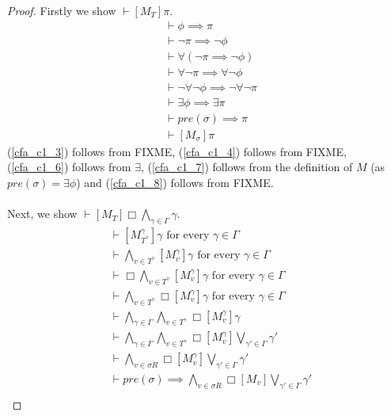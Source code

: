 \documentclass[12pt, a4paper, titlepage]{scrartcl}
\numberwithin{equation}{section}
\newcommand{\sqex}[1]{[{#1}]}
\begin{document}
\begin{proof}
Firstly we show $\vdash \sqex{M_T} \pi$.
\begin{align}
	& \vdash \phi \implies \pi \label{cfa_c1_1} \\
	& \vdash \neg \pi \implies \neg \phi \label{cfa_c1_2}\\
	& \vdash \forall (\neg \pi \implies \neg \phi) \label{cfa_c1_3}\\
	& \vdash \forall \neg \pi \implies \forall \neg \phi \label{cfa_c1_4}\\
	& \vdash \neg \forall \neg \phi \implies \neg \forall \neg \pi \label{cfa_c1_5}\\
	& \vdash \exists \phi \implies \exists \pi \label{cfa_c1_6}\\
	& \vdash pre(\sigma) \implies \pi \label{cfa_c1_7}\\
	& \vdash \sqex{M_\sigma} \pi \label{cfa_c1_8}
\end{align}
(\ref{cfa_c1_3}) follows from FIXME, (\ref{cfa_c1_4}) follows from FIXME, (\ref{cfa_c1_6}) follows from
$\exists$, (\ref{cfa_c1_7}) follows from the definition of $M$ (as $pre(\sigma) = \exists \phi$) and
(\ref{cfa_c1_8}) follows from FIXME.\\
\\
Next, we show $\vdash \sqex{M_T} \Box \bigwedge_{\gamma \in \Gamma} \gamma$.
\begin{align}
	& \vdash \sqex{M^{\gamma}_{T^{\gamma}}} \gamma \text{ for every }\gamma \in \Gamma
	\label{cfa_c2_1} \\
	& \vdash \bigwedge_{v \in T^\gamma} \sqex{M^\gamma_v} \gamma \text{ for every }\gamma \in \Gamma\label{cfa_c2_1} \\
	& \vdash \Box \bigwedge_{v \in T^\gamma} \sqex{M^\gamma_v} \gamma \text{ for every } \gamma \in \Gamma\label{cfa_c2_2} \\
	& \vdash \bigwedge_{v \in T^\gamma} \Box \sqex{M^\gamma_v} \gamma \text{ for every } \gamma \in \Gamma\label{cfa_c2_3} \\
	& \vdash \bigwedge_{\gamma \in \Gamma} \bigwedge_{v \in T^\gamma} \Box \sqex{M^\gamma_v} \gamma\label{cfa_c2_4} \\
	& \vdash \bigwedge_{\gamma \in \Gamma} \bigwedge_{v \in T^\gamma} \Box \sqex{M^\gamma_v}
	\bigvee_{\gamma' \in \Gamma} \gamma'\label{cfa_c2_5} \\
	& \vdash \bigwedge_{v \in \sigma R} \Box \sqex{M^\gamma_v}\bigvee_{\gamma' \in \Gamma} \gamma'\label{cfa_c2_6} \\
	& \vdash pre(\sigma) \implies \bigwedge_{v \in \sigma R} \Box \sqex{M_v} \bigvee_{\gamma' \in \Gamma} \gamma'\label{cfa_c2_7} \\

\end{align}
\end{proof}
\end{document}
